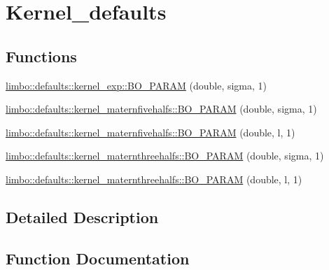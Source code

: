 \hypertarget{group__kernel__defaults}{}\section{Kernel\+\_\+defaults}
\label{group__kernel__defaults}
\subsection*{Functions}
\begin{DoxyCompactItemize}
\item 
\hyperlink{group__kernel__defaults_ga14c991dc7de698f2af7a689b157ace9c}{limbo\+::defaults\+::kernel\+\_\+exp\+::\+B\+O\+\_\+\+P\+A\+R\+A\+M} (double, sigma, 1)
\item 
\hyperlink{group__kernel__defaults_ga784d4f60df0708935c742652168d132c}{limbo\+::defaults\+::kernel\+\_\+maternfivehalfs\+::\+B\+O\+\_\+\+P\+A\+R\+A\+M} (double, sigma, 1)
\item 
\hyperlink{group__kernel__defaults_gaae66735209158acd497dc5034fa535ff}{limbo\+::defaults\+::kernel\+\_\+maternfivehalfs\+::\+B\+O\+\_\+\+P\+A\+R\+A\+M} (double, l, 1)
\item 
\hyperlink{group__kernel__defaults_ga59b38b1e10b24b9192a2f7ff05735186}{limbo\+::defaults\+::kernel\+\_\+maternthreehalfs\+::\+B\+O\+\_\+\+P\+A\+R\+A\+M} (double, sigma, 1)
\item 
\hyperlink{group__kernel__defaults_ga8764c13406e6fe0ab8f3c79d200c5e96}{limbo\+::defaults\+::kernel\+\_\+maternthreehalfs\+::\+B\+O\+\_\+\+P\+A\+R\+A\+M} (double, l, 1)
\end{DoxyCompactItemize}


\subsection{Detailed Description}


\subsection{Function Documentation}
\hypertarget{group__kernel__defaults_ga14c991dc7de698f2af7a689b157ace9c}{}
